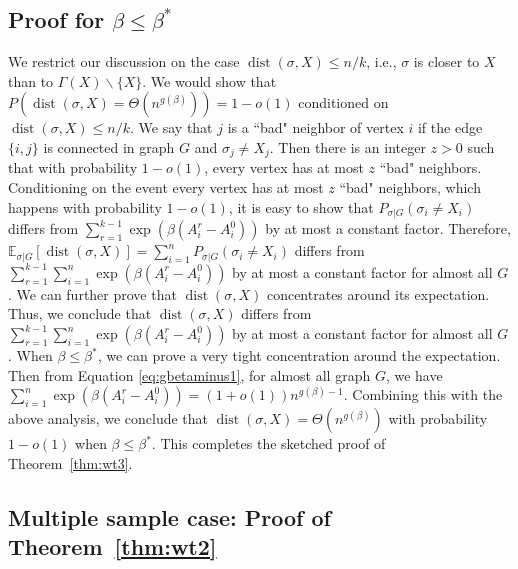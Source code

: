 \documentclass[conference]{IEEEtran}
\DeclareMathOperator{\dist}{dist}
\begin{document}
\subsection{Proof for $\beta\le\beta^\ast$}\label{subsect:smaller}
We restrict our discussion on the case $\dist(\sigma,X)\le n/k$, i.e., $\sigma$ is closer to $X$ than to $\Gamma(X)\backslash\{X\}$.
We would show that $P(\dist(\sigma, X) = \Theta(n^{g(\beta)})) = 1 - o(1)$ conditioned on $\dist(\sigma,X)\le n/k$.
We say that $j$ is a ``bad" neighbor of vertex $i$ if the edge $\{i,j\}$ is connected in graph $G$ and $\sigma_j\neq X_j$. Then there is an integer $z>0$ such that with probability $1-o(1)$, every vertex has at most $z$ ``bad" neighbors.
Conditioning on the event every vertex has at most $z$ ``bad" neighbors, which happens with probability $1-o(1)$, it is easy to show that $P_{\sigma|G}(\sigma_i \neq X_i)$ differs from $\sum_{r=1}^{k-1}\exp (\beta (A^r_i-A^0_i))$ by at most a constant factor. 
Therefore, $\mathbb{E}_{\sigma|G}[\dist(\sigma,X)]=\sum_{i=1}^n P_{\sigma|G}(\sigma_i \neq X_i)$ differs from
$\sum_{r=1}^{k-1} \sum_{i=1}^n\exp (\beta (A^r_i-A^0_i))$ by at most a constant factor for almost all $G$.
We can further prove that $\dist(\sigma,X)$ concentrates around its expectation.
Thus, we conclude that $\dist(\sigma,X)$ differs from
$\sum_{r=1}^{k-1} \sum_{i=1}^n\exp (\beta (A^r_i-A^0_i))$ by at most a constant factor for almost all $G$.
When $\beta\le\beta^\ast$, we can prove a very tight concentration around the expectation. Then from Equation \eqref{eq:gbetaminus1}, for almost all graph $G$, we have $\sum_{i=1}^n\exp (\beta (A^r_i-A^0_i))=(1+o(1))n^{g(\beta)-1}$.
Combining this with the above analysis,
we conclude that $\dist(\sigma,X)=\Theta(n^{g(\beta)})$ with probability $1-o(1)$ when $\beta\le\beta^\ast$.
This completes the sketched proof of Theorem~\ref{thm:wt3}.

\subsection{Multiple sample case: Proof of Theorem~\ref{thm:wt2}}
\label{sect:multi}
\end{document}
